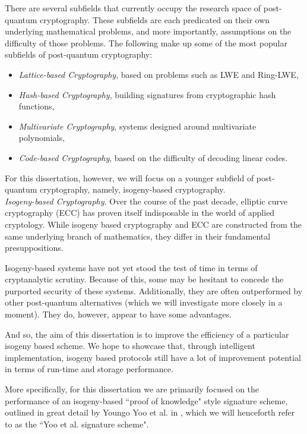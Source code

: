 There are several subfields that currently occupy the research space of post-quantum cryptography. These subfields are each predicated on their own underlying mathematical problems, and more importantly, assumptions on the difficulty of those problems. The following make up some of the most popular subfields of post-quantum cryptography: 
\begin{itemize}
\item \textit{Lattice-based Cryptography}, based on problems such as LWE and Ring-LWE, 
\item \textit{Hash-based Cryptography}, building signatures from cryptographic hash functions, 
\item \textit{Multivariate Cryptography}, systems designed around multivariate polynomials, 
\item \textit{Code-based Cryptography}, based on the difficulty of decoding linear codes.
\end{itemize}

For this dissertation, however, we will focus on a younger subfield of post-quantum cryptography, namely, isogeny-based cryptography.\\

\noindent
\textit{Isogeny-based Cryptography}. Over the course of the past decade, elliptic curve cryptography (ECC) has proven itself indisposable in the world of applied cryptology. While isogeny based cryptography and ECC are constructed from the same underlying branch of mathematics, they differ in their fundamental presuppositions.

Isogeny-based systems have not yet stood the test of time in terms of cryptanalytic scrutiny. Because of this, some may be hesitant to concede the purported security of these systems. Additionally, they are often outperformed by other post-quantum alternatives (which we will investigate more closely in a moment). They do, however, appear to have some advantages. 

And so, the aim of this dissertation is to improve the efficiency of a particular isogeny based scheme. We hope to showcase that, through intelligent implementation, isogeny based protocols still have a lot of improvement potential in terms of run-time and storage performance.

More specifically, for this dissertation we are primarily focused on the performance of an isogeny-based ``proof of knowledge" style signature scheme, outlined in great detail by Youngo Yoo et al. in \cite{yoo}, which we will henceforth refer to as the ``Yoo et al. signature scheme".

